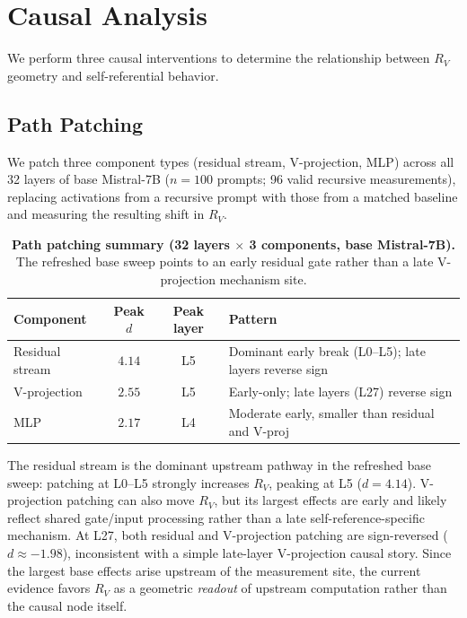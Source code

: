 \documentclass{article}
\newcommand{\RV}{R_V}
\newcommand{\dcohen}{d}
\begin{document}
\section{Causal Analysis}
\label{sec:causal}

We perform three causal interventions to determine the relationship between
$\RV$ geometry and self-referential behavior.

\subsection{Path Patching}
\label{sec:pathpatch}

We patch three component types (residual stream, V-projection, MLP) across all
32 layers of base Mistral-7B ($n = 100$ prompts; 96 valid recursive measurements), replacing activations
from a recursive prompt with those from a matched baseline and measuring the resulting shift in $\RV$.

\begin{table}[ht]
\centering
\caption{\textbf{Path patching summary (32 layers $\times$ 3 components, base Mistral-7B).}
         The refreshed base sweep points to an early residual gate rather than a late V-projection mechanism site.}
\label{tab:pathpatch}
\smallskip
\begin{tabular}{lccp{5.5cm}}
\toprule
\textbf{Component} & \textbf{Peak $\dcohen$} & \textbf{Peak layer} & \textbf{Pattern} \\
\midrule
Residual stream & $4.14$ & L5 & Dominant early break (L0--L5); late layers reverse sign \\
V-projection    & $2.55$ & L5 & Early-only; late layers (L27) reverse sign \\
MLP             & $2.17$ & L4 & Moderate early, smaller than residual and V-proj \\
\bottomrule
\end{tabular}
\end{table}

The residual stream is the dominant upstream pathway in the refreshed base sweep:
patching at L0--L5 strongly increases $\RV$, peaking at L5 ($\dcohen = 4.14$).
V-projection patching can also move $\RV$, but its largest effects are early and likely reflect
shared gate/input processing rather than a late self-reference-specific mechanism.
At L27, both residual and V-projection patching are sign-reversed ($\dcohen \approx -1.98$),
inconsistent with a simple late-layer V-projection causal story.
Since the largest base effects arise upstream of the measurement site, the current evidence favors
$\RV$ as a geometric \emph{readout} of upstream computation rather than the causal node itself.
\end{document}
